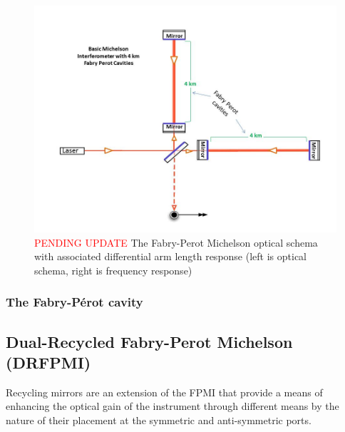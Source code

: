 \begin{figure}[H]
\begin{center}
\includegraphics[width=\textwidth]{figs/INTRO/tempsub_Basic_michelson_with_FP_labeled.jpg}
\end{center}
\caption{\textcolor{red}{PENDING UPDATE} The Fabry-Perot Michelson optical schema with associated differential arm length response (left is optical schema, right is frequency response)}
\label{fig:fp_michelson}
\end{figure}

\subsubsection{The Fabry-P\'{e}rot cavity}

\subsection{Dual-Recycled Fabry-Perot Michelson (DRFPMI)}
Recycling mirrors are an extension of the FPMI that provide a means of enhancing the optical gain of the instrument through different means by the nature of their placement at the symmetric and anti-symmetric ports.

